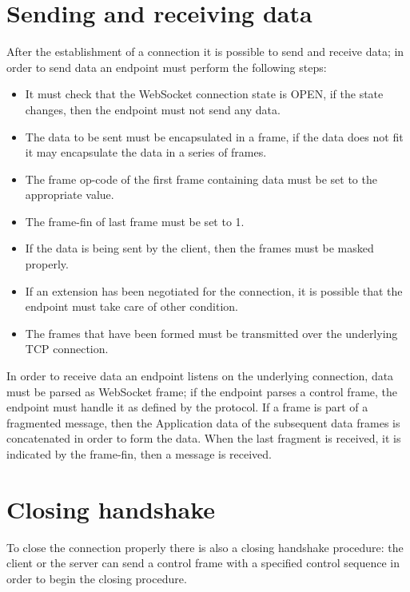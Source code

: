 \section{Sending and receiving data}\label{sc:sending}
After the establishment of a connection it is possible to send and receive data; in order to send data an endpoint must perform the following steps:
\begin{itemize}
	\item It must check that the WebSocket connection state is OPEN, if the state changes, then the endpoint must not send any data.
	\item The data to be sent must be encapsulated in a frame, if the data does not fit it may encapsulate the data in a series of frames.
	\item The frame op-code of the first frame containing data must be set to the appropriate value.
	\item The frame-fin of last frame must be set to 1.
	\item If the data is being sent by the client, then the frames must be masked properly.
	\item If an extension has been negotiated for the connection, it is possible that the endpoint must take care of other condition.
	\item The frames that have been formed must be transmitted over the underlying TCP connection.
\end{itemize}

In order to receive data an endpoint listens on the underlying connection, data must be parsed as WebSocket frame;
if the endpoint parses a control frame, the endpoint must handle it as defined by the protocol.\newline
If a frame is part of a fragmented message, then the Application data of the subsequent data frames is concatenated in order to form the data.\newline
When the last fragment is received, it is indicated by the frame-fin, then a message is received.\newline

\section{Closing handshake}\label{sc:closing}
To close the connection properly there is also a closing handshake procedure: the client or
the server can send a control frame with a specified control sequence in order to begin the closing procedure.\newline

